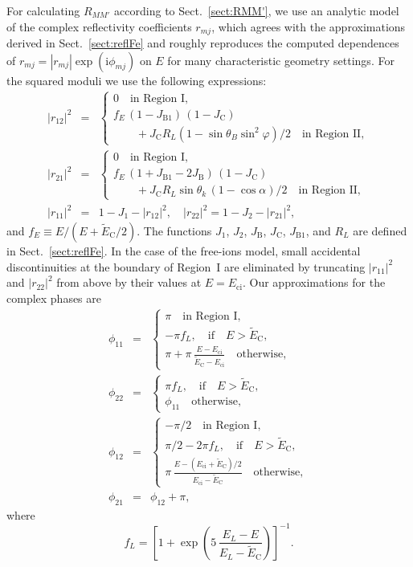 \documentclass{aa}
\newcommand{\bea}{\begin{eqnarray}}
\newcommand{\eea}{\end{eqnarray}}
\newcommand{\Eci}{E_\mathrm{ci}}
\newcommand{\tEC}{\tilde{E}_\mathrm{C}}
\begin{document}
For calculating $R_{MM'}$ according to
Sect.~\ref{sect:RMM'}, we use an analytic model of the
complex reflectivity coefficients $r_{mj}$, which
agrees with the approximations derived in
Sect.~\ref{sect:reflFe} and roughly reproduces the
computed dependences of
 $r_{mj}=|r_{mj}|\exp(\mathrm{i}\phi_{mj})$
  on $E$ for many characteristic geometry settings. For the
squared moduli we use the following expressions:
\bea
   |r_{12}|^2 &=& \left\{ \begin{array}{l}
   0 \quad\textrm{in Region~I},
    \\ 
    f_E\,(1-J_\mathrm{B1})\,(1-J_\mathrm{C})   
    \\ \qquad
     + J_\mathrm{C} R_L
     (1-\sin\theta_B\sin^2\varphi)/2
       \quad\textrm{in Region~II},
    \end{array} \right.
\\
   |r_{21}|^2 &=& \left\{ \begin{array}{l}
   0 \quad\textrm{in Region~I},
    \\ 
    f_E\,(1+J_\mathrm{B1}-2J_\mathrm{B})\,(1-J_\mathrm{C})
    \\ \qquad 
       + J_\mathrm{C} R_L \sin\theta_k\,(1-\cos\alpha)/2
    \quad\textrm{in Region~II},
    \end{array} \right.
\\
      |r_{11}|^2 &=& 1-J_1-|r_{12}|^2,
\quad
      |r_{22}|^2 = 1-J_2-|r_{21}|^2,
\eea
and $ f_E \equiv E/(E+\tEC/2) $.
The functions
$J_\mathrm{1}$, $J_\mathrm{2}$, $J_\mathrm{B}$,
$J_\mathrm{C}$, 
$J_\mathrm{B1}$,
and $R_L$ are
defined in Sect.~\ref{sect:reflFe}.
In the case of the free-ions model,
small accidental discontinuities
at the boundary of Region~I are eliminated by truncating
$|r_{11}|^2$ and $|r_{22}|^2$ from above
by their values at $E=\Eci$.
Our approximations for the complex phases are
\bea
   \phi_{11} &=& \left\{ \begin{array}{l}
       \pi \quad\textrm{in Region~I},
       \\ 
       -\pi f_L,
       \quad\textrm{if}\quad E>\tEC,
       \\
       \displaystyle{
       \pi + \pi\,\frac{E-\Eci}{\tEC-\Eci}
       }
       \quad\textrm{otherwise},
    \end{array} \right.
    \\
    \phi_{22} &=& \left\{ \begin{array}{l}
       \pi f_L,
       \quad\textrm{if}\quad E>\tEC,
       \\
       \phi_{11}
       \quad\textrm{otherwise},
    \end{array} \right.
    \\
    \phi_{12} &=&  \left\{ \begin{array}{l}
       -\pi/2 \quad\textrm{in Region~I},
       \\ 
       \pi/2 - 2\pi f_L,
       \quad\textrm{if}\quad E>\tEC,
       \\
       {\displaystyle
       \pi\,\frac{E-(\Eci+\tEC)/2}{\Eci-\tEC}
       }
       \quad\textrm{otherwise},
    \end{array} \right.
    \\
    \phi_{21} &=& \phi_{12}+\pi,
\eea
where
\[
    f_L =
    \left[1+\exp\left( 5\,
         \frac{E_L-E}{E_L-\tEC}
          \right)\right]^{-1}.
\]
\end{document}
